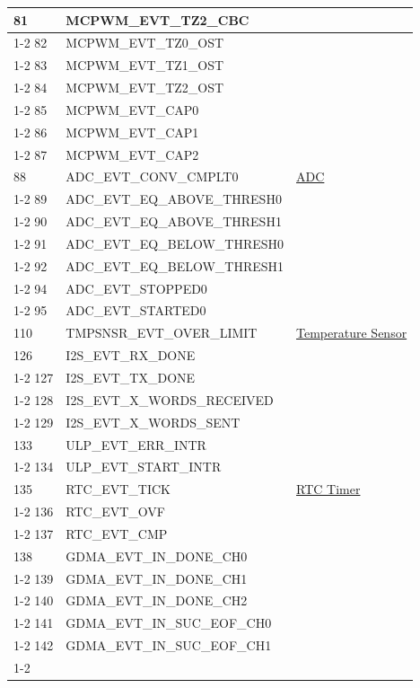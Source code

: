 \documentclass[main\_\_EN.tex]{subfiles}
\begin{document}
\begin{longtable}{ | l | l | l | }
81  & MCPWM\_EVT\_TZ2\_CBC & \\ \cline{1-2}
82  & MCPWM\_EVT\_TZ0\_OST & \\ \cline{1-2}
83  & MCPWM\_EVT\_TZ1\_OST & \\ \cline{1-2}
84  & MCPWM\_EVT\_TZ2\_OST & \\ \cline{1-2}
85  & MCPWM\_EVT\_CAP0   & \\ \cline{1-2}
86  & MCPWM\_EVT\_CAP1   & \\ \cline{1-2}
87  & MCPWM\_EVT\_CAP2   & \\ \hline
88  & ADC\_EVT\_CONV\_CMPLT0    & \hyperref[mod:sensor]{ADC}   \\ \cline{1-2}
89  & ADC\_EVT\_EQ\_ABOVE\_THRESH0     & \\ \cline{1-2}
90  & ADC\_EVT\_EQ\_ABOVE\_THRESH1     & \\ \cline{1-2}
91  & ADC\_EVT\_EQ\_BELOW\_THRESH0     & \\ \cline{1-2}
92  & ADC\_EVT\_EQ\_BELOW\_THRESH1     & \\ \cline{1-2}
94  & ADC\_EVT\_STOPPED0 & \\ \cline{1-2}
95  & ADC\_EVT\_STARTED0 & \\ \hline
110 & TMPSNSR\_EVT\_OVER\_LIMIT & \hyperref[mod:sensor]{Temperature Sensor}  \\ \hline
126 & I2S\_EVT\_RX\_DONE & \nameref{mod:i2s}   \\ \cline{1-2}
127 & I2S\_EVT\_TX\_DONE & \\ \cline{1-2}
128 & I2S\_EVT\_X\_WORDS\_RECEIVED     & \\ \cline{1-2}
129 & I2S\_EVT\_X\_WORDS\_SENT  & \\ \hline
133 & ULP\_EVT\_ERR\_INTR  & \nameref{mod:ulp}   \\ \cline{1-2}
134 & ULP\_EVT\_START\_INTR& \\ \hline
135 & RTC\_EVT\_TICK     & \hyperref[mod:lowpowm]{RTC Timer}   \\ \cline{1-2}
136 & RTC\_EVT\_OVF      & \\ \cline{1-2}
137 & RTC\_EVT\_CMP      & \\ \hline
138 & GDMA\_EVT\_IN\_DONE\_CH0  & \nameref{mod:dma} \\ \cline{1-2}
139 & GDMA\_EVT\_IN\_DONE\_CH1  & \\ \cline{1-2}
140 & GDMA\_EVT\_IN\_DONE\_CH2  & \\ \cline{1-2}
141 & GDMA\_EVT\_IN\_SUC\_EOF\_CH0     & \\ \cline{1-2}
142 & GDMA\_EVT\_IN\_SUC\_EOF\_CH1     & \\ \cline{1-2}

\end{longtable}
\end{document}
